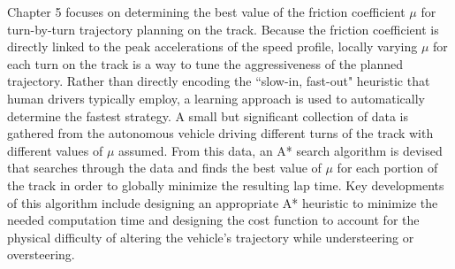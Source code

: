 Chapter 5 focuses on determining the best value of the friction coefficient $\mu$ for turn-by-turn trajectory planning on the track. Because
the friction coefficient is directly linked to the peak accelerations of the speed profile, locally varying $\mu$ for each turn on the track is a way
to tune the aggressiveness of the planned trajectory. Rather than directly encoding the ``slow-in, fast-out" heuristic that human drivers
typically employ, a learning approach is used to automatically determine the fastest strategy. A small but significant collection of data is gathered
from the autonomous vehicle driving different turns of the track with different values of $\mu$ assumed. From this data, an A* search algorithm
is devised that searches through the data and finds the best value of $\mu$ for each portion of the track in order to globally minimize the resulting
lap time. Key developments of this algorithm include designing an appropriate A* heuristic to minimize the needed computation time and designing the cost
function to account for the physical difficulty of altering the vehicle's trajectory while understeering or oversteering. 





